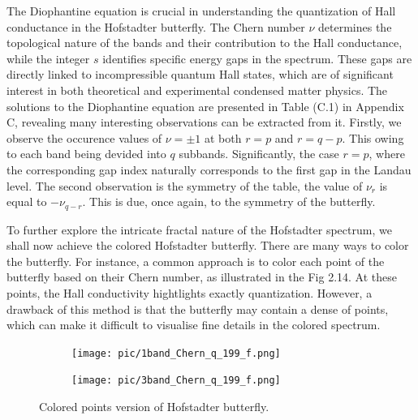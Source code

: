 \documentclass{report}
\begin{document}
The Diophantine equation is crucial in understanding the quantization of Hall conductance in the Hofstadter butterfly. The Chern number $\nu$ determines the topological nature of the bands and their contribution to the Hall conductance, while the integer $s$ identifies specific energy gaps in the spectrum. These gaps are directly linked to incompressible quantum Hall states, which are of significant interest in both theoretical and experimental condensed matter physics. The solutions to the Diophantine equation are presented in Table (C.1) in Appendix C, revealing many interesting observations can be extracted from it. Firstly, we observe the occurence values of $\nu = \pm 1$ at both $r = p$ and $r = q-p$. This owing to each band being devided into $q$ subbands. Significantly, the case $r = p$, where the corresponding gap index naturally corresponds to the first gap in the Landau level. The second observation is the symmetry of the table, the value of $\nu_{r}$ is equal to $-\nu_{q-r}$. This is due, once again, to the symmetry of the butterfly.

To further explore the intricate fractal nature of the Hofstadter spectrum, we shall now achieve the colored Hofstadter butterfly. There are many ways to color the butterfly. For instance, a common approach is to color each point of the butterfly based on their Chern number, as illustrated in the Fig 2.14. At these points, the Hall conductivity hightlights exactly quantization. However, a drawback of this method is that the butterfly may contain a dense of points, which can make it difficult to visualise fine details in the colored spectrum.
\begin{figure}[htb]
	\centering
	\begin{subfigure}[b]{0.495\textwidth}
		\centering
		{\texttt{[image: pic/1band\_Chern\_q\_199\_f.png]}}
	\end{subfigure}
	\begin{subfigure}[b]{0.495\textwidth}
		\centering
		\texttt{[image: pic/3band\_Chern\_q\_199\_f.png]}
	\end{subfigure}
	\caption{
		Colored points version of Hofstadter butterfly.
	}
\end{figure}
\end{document}
